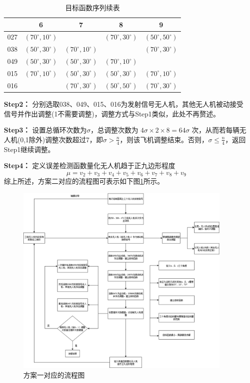 \documentclass[withoutpreface,bwprint]{cumcmthesis} %
\begin{document}
\begin{enumerate}
\begin{table}[htbp]
  \centering
  \caption{目标函数序列续表}
  \label{表4}
  \begin{tabular}{ccccc}
    \toprule
    & 6 & 7 & 8 & 9 \\
    \midrule
    027 & $(70^\circ, 10^\circ)$ &  & $(70^\circ, 30^\circ)$ & $(50^\circ, 50^\circ)$ \\
    038 & $(50^\circ, 30^\circ)$ & $(70^\circ, 10^\circ)$ &  & $(70^\circ, 30^\circ)$ \\
    049 & $(50^\circ, 30^\circ)$ & $(50^\circ, 30^\circ)$ & $(70^\circ, 10^\circ)$ &  \\
    015 & $(70^\circ, 10^\circ)$ & $(50^\circ, 30^\circ)$ & $(50^\circ, 30^\circ)$ & $(70^\circ, 10^\circ)$ \\
    016 &  & $(70^\circ, 30^\circ)$ & $(50^\circ, 50^\circ)$ & $(70^\circ, 30^\circ)$ \\
    \bottomrule
  \end{tabular}
\end{table}

    \textbf{Step2：} 分别选取038、049、015、016为发射信号无人机，其他无人机被动接受信号并作出调整(1不需要调整)，调整方式与Step1类似，此处不再赘述。

    \textbf{Step3：} 设置总循环次数为$\sigma$，总调整次数为 $4\sigma \times 2 \times 8 = 64\sigma$ 次，从而若每辆无人机(0,1除外)调整次数超过7，即$\sigma>\frac{n}{4}$，则该飞机调整结束。否则，$\sigma \leq\frac{n}{4}$，返回Step1继续调整。


    \textbf{Step4：} 定义误差检测函数量化无人机趋于正九边形程度
\[
\mu = v_2 + v_3 + v_4 + v_5 + v_6 + v_7 + v_8 + v_9
\]
综上所述，方案二对应的流程图可表示如下图\ref{q3_2}所示。

\begin{figure}[H]
    \centering
    \includegraphics[width=0.95\textwidth]{../../figure/q3_2.png} 
    \caption{方案一对应的流程图}
    \label{q3_2}    
\end{figure}



\end{enumerate}
\end{document}
